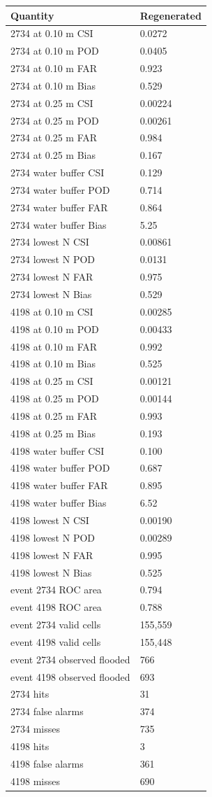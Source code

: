 \begin{tabular}{ll}
Quantity & Regenerated \\
\hline
2734 at 0.10 m CSI & 0.0272 \\
2734 at 0.10 m POD & 0.0405 \\
2734 at 0.10 m FAR & 0.923 \\
2734 at 0.10 m Bias & 0.529 \\
2734 at 0.25 m CSI & 0.00224 \\
2734 at 0.25 m POD & 0.00261 \\
2734 at 0.25 m FAR & 0.984 \\
2734 at 0.25 m Bias & 0.167 \\
2734 water buffer CSI & 0.129 \\
2734 water buffer POD & 0.714 \\
2734 water buffer FAR & 0.864 \\
2734 water buffer Bias & 5.25 \\
2734 lowest N CSI & 0.00861 \\
2734 lowest N POD & 0.0131 \\
2734 lowest N FAR & 0.975 \\
2734 lowest N Bias & 0.529 \\
4198 at 0.10 m CSI & 0.00285 \\
4198 at 0.10 m POD & 0.00433 \\
4198 at 0.10 m FAR & 0.992 \\
4198 at 0.10 m Bias & 0.525 \\
4198 at 0.25 m CSI & 0.00121 \\
4198 at 0.25 m POD & 0.00144 \\
4198 at 0.25 m FAR & 0.993 \\
4198 at 0.25 m Bias & 0.193 \\
4198 water buffer CSI & 0.100 \\
4198 water buffer POD & 0.687 \\
4198 water buffer FAR & 0.895 \\
4198 water buffer Bias & 6.52 \\
4198 lowest N CSI & 0.00190 \\
4198 lowest N POD & 0.00289 \\
4198 lowest N FAR & 0.995 \\
4198 lowest N Bias & 0.525 \\
event 2734 ROC area & 0.794 \\
event 4198 ROC area & 0.788 \\
event 2734 valid cells & 155,559 \\
event 4198 valid cells & 155,448 \\
event 2734 observed flooded & 766 \\
event 4198 observed flooded & 693 \\
2734 hits & 31 \\
2734 false alarms & 374 \\
2734 misses & 735 \\
4198 hits & 3 \\
4198 false alarms & 361 \\
4198 misses & 690 \\
\end{tabular}
